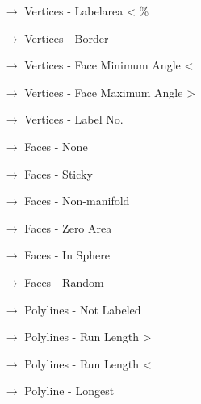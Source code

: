 {\begin{itemize}
\begin{itemize}
 \item[$\rightarrow$] Vertices - Labelarea < \%
 \item[$\rightarrow$] Vertices - Border
 \item[$\rightarrow$] Vertices - Face Minimum Angle <
 \item[$\rightarrow$] Vertices - Face Maximum Angle >
 \item[$\rightarrow$] Vertices - Label No.
 \item[$\rightarrow$] Faces - None
 \item[$\rightarrow$] Faces - Sticky
 \item[$\rightarrow$] Faces - Non-manifold
 \item[$\rightarrow$] Faces - Zero Area
 \item[$\rightarrow$] Faces - In Sphere
 \item[$\rightarrow$] Faces - Random
 \item[$\rightarrow$] Polylines - Not Labeled
 \item[$\rightarrow$] Polylines - Run Length >
 \item[$\rightarrow$] Polylines - Run Length <
 \item[$\rightarrow$] Polyline - Longest 
 \end{itemize}
 \end{itemize}
 }


